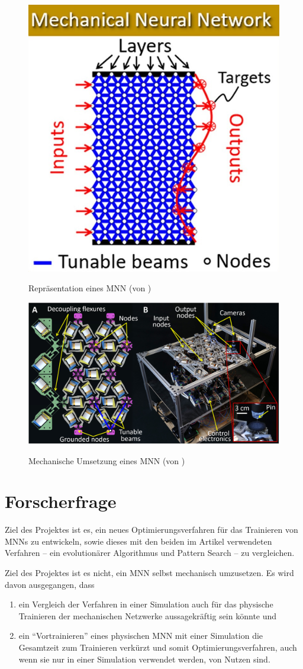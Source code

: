 \documentclass[parskip]{scrartcl}
\begin{document}
\begin{figure}
    \centering
    \includegraphics[width=0.4\linewidth]{bilder/mnn1-1.jpg}
    \label{fig:mnn1-1}
    \caption{Repräsentation eines MNN (von \cite{Lee2022})}
\end{figure}

\begin{figure}
    \centering
    \includegraphics[width=0.7\linewidth]{bilder/mnn2-1.jpg}
    \label{fig:mnn2-1}
    \caption{Mechanische Umsetzung eines MNN (von \cite{Lee2022})}
\end{figure}

\section{Forscherfrage}

Ziel des Projektes ist es, ein neues Optimierungsverfahren für das Trainieren von MNNs zu entwickeln, sowie dieses mit den beiden im Artikel verwendeten Verfahren -- ein evolutionärer Algorithmus und Pattern Search -- zu vergleichen.

Ziel des Projektes ist es nicht, ein MNN selbst mechanisch umzusetzen.
Es wird davon ausgegangen, dass 
\begin{enumerate}
    \item ein Vergleich der Verfahren in einer Simulation auch für das physische Trainieren der mechanischen Netzwerke aussagekräftig sein könnte und
    \item ein \enquote{Vortrainieren} eines physischen MNN mit einer Simulation die Gesamtzeit zum Trainieren verkürzt und somit Optimierungsverfahren, auch wenn sie nur in einer Simulation verwendet werden, von Nutzen sind.
\end{enumerate}
\end{document}
